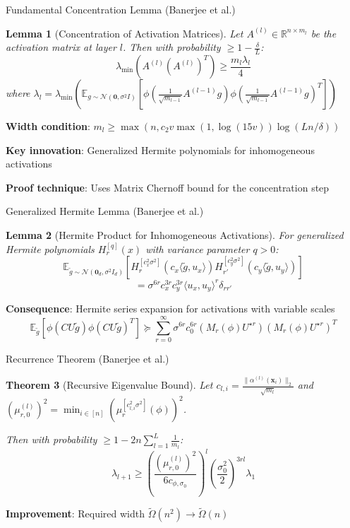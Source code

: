 \documentclass{beamer}
\newtheorem{theorem}{Theorem}[section]
\newtheorem{lemma}[theorem]{Lemma}
\newcommand{\E}{\mathbb{E}}
\newcommand{\R}{\mathbb{R}}
\newcommand{\evmin}[1]{\lambda_{\min}\left(#1\right)}
\newcommand{\x}{\mathbf{x}}
\begin{document}
\begin{frame}{Fundamental Concentration Lemma (Banerjee et al.)}
  \begin{lemma}[Concentration of Activation Matrices]
  Let $A^{(l)} \in \R^{n \times m_l}$ be the activation matrix at layer $l$. Then with probability $\geq 1 - \frac{\delta}{L}$:
  $$\evmin{A^{(l)}(A^{(l)})^T} \geq \frac{m_l \lambda_l}{4}$$
  where $\lambda_l = \evmin{\E_{g \sim \mathcal{N}(\bm{0}, \sigma^2 I)} \left[ \phi\left(\frac{1}{\sqrt{m_{l-1}}} A^{(l-1)} g\right) \phi\left(\frac{1}{\sqrt{m_{l-1}}} A^{(l-1)} g\right)^T \right]}$
  \end{lemma}
  
  \textbf{Width condition}: $m_l \geq \max\left(n, c_2 v \max(1, \log(15v)) \log(Ln/\delta)\right)$
  
  \textbf{Key innovation}: Generalized Hermite polynomials for inhomogeneous activations
  
  \textbf{Proof technique}: Uses Matrix Chernoff bound for the concentration step
\end{frame}

\begin{frame}{Generalized Hermite Lemma (Banerjee et al.)}
  \begin{lemma}[Hermite Product for Inhomogeneous Activations]
  For generalized Hermite polynomials $H_r^{[q]}(x)$ with variance parameter $q > 0$:
  $$\E_{\tilde{g} \sim \mathcal{N}(\bm{0}_d, \sigma^2 I_d)} [H_r^{[c_x^2 \sigma^2]}(c_x \langle \tilde{g}, u_x \rangle) H_{r'}^{[c_y^2 \sigma^2]}(c_y \langle \tilde{g}, u_y \rangle)]$$
  $$= \sigma^{6r} c_x^{3r} c_y^{3r} \langle u_x, u_y \rangle^r \delta_{rr'}$$
  \end{lemma}
  
  \textbf{Consequence}: Hermite series expansion for activations with variable scales
  $$\E_{\tilde{g}} [\phi(CU\tilde{g}) \phi(CU\tilde{g})^T] \succeq \sum_{r=0}^{\infty} \sigma^{6r} c_0^{6r} (M_r(\phi) U^{\star r})(M_r(\phi) U^{\star r})^T$$
\end{frame}

\begin{frame}{Recurrence Theorem (Banerjee et al.)}
  \begin{theorem}[Recursive Eigenvalue Bound]
  Let $c_{l,i} = \frac{\|\alpha^{(l)}(\x_i)\|_2}{\sqrt{m_l}}$ and $(\mu_{r,0}^{(l)})^2 = \min_{i \in [n]} (\mu_r^{[c_{l,i}^2 \sigma^2]}(\phi))^2$.
  
  Then with probability $\geq 1 - 2n\sum_{l=1}^L \frac{1}{m_l}$:
  $$\lambda_{l+1} \geq \left(\frac{(\mu_{r,0}^{(l)})^2}{6 c_{\phi,\sigma_0}}\right)^l \left(\frac{\sigma_0^2}{2}\right)^{3rl} \lambda_1$$
  \end{theorem}
  
  \textbf{Improvement}: Required width $\tilde{\Omega}(n^2) \rightarrow \tilde{\Omega}(n)$
\end{frame}
\end{document}
